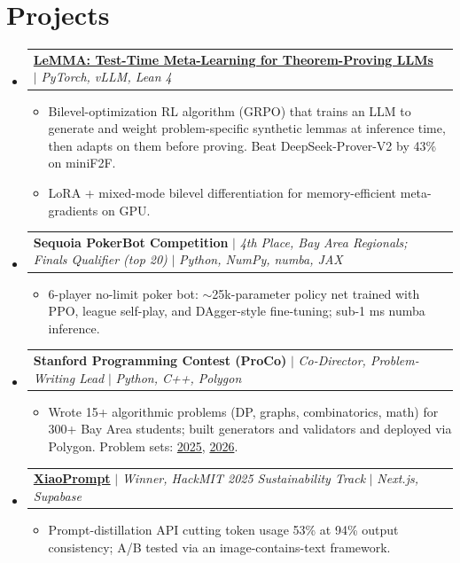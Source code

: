 \documentclass[letterpaper,10.5pt]{article}
\makeatletter
\newcommand{\resumeItem}[1]{\item\small{{#1 \vspace{-1pt}}}}
\newcommand{\resumeProjectHeading}[2]{
    \item
    \begin{tabular*}{0.97\textwidth}{l@{\extracolsep{\fill}}r}
      \small#1 & #2 \\
    \end{tabular*}\vspace{-7pt}
}
\newcommand{\resumeSubHeadingListStart}{\begin{itemize}[leftmargin=0.15in, label={}]}
\newcommand{\resumeSubHeadingListEnd}{\end{itemize}}
\newcommand{\resumeItemListStart}{\begin{itemize}}
\newcommand{\resumeItemListEnd}{\end{itemize}\vspace{-4pt}}
\makeatother
\begin{document}
\section{Projects}
    \resumeSubHeadingListStart
      \resumeProjectHeading
          {\textbf{\href{https://sandrayang.com/lemma.pdf}{LeMMA: Test-Time Meta-Learning for Theorem-Proving LLMs}} $|$ \emph{PyTorch, vLLM, Lean 4}}{}
          \resumeItemListStart
            \resumeItem{Bilevel-optimization RL algorithm (GRPO) that trains an LLM to generate and weight problem-specific synthetic lemmas at inference time, then adapts on them before proving. Beat DeepSeek-Prover-V2 by 43\% on miniF2F.}
            \resumeItem{LoRA + mixed-mode bilevel differentiation for memory-efficient meta-gradients on GPU.}
          \resumeItemListEnd
      \resumeProjectHeading
          {\textbf{Sequoia PokerBot Competition} $|$ \emph{4th Place, Bay Area Regionals; Finals Qualifier (top 20)} $|$ \emph{Python, NumPy, numba, JAX}}{}
          \resumeItemListStart
            \resumeItem{6-player no-limit poker bot: $\sim$25k-parameter policy net trained with PPO, league self-play, and DAgger-style fine-tuning; sub-1 ms numba inference.}
          \resumeItemListEnd
      \resumeProjectHeading
          {\textbf{Stanford Programming Contest (ProCo)} $|$ \emph{Co-Director, Problem-Writing Lead} $|$ \emph{Python, C++, Polygon}}{}
          \resumeItemListStart
            \resumeItem{Wrote 15+ algorithmic problems (DP, graphs, combinatorics, math) for 300+ Bay Area students; built generators and validators and deployed via Polygon. Problem sets: \href{https://codeforces.com/gym/592245}{2025}, \href{https://codeforces.com/gym/676302}{2026}.}
          \resumeItemListEnd
      \resumeProjectHeading
          {\textbf{\href{https://github.com/birdhumming/xiao-prompt}{XiaoPrompt}} $|$ \emph{Winner, HackMIT 2025 Sustainability Track} $|$ \emph{Next.js, Supabase}}{}
          \resumeItemListStart
            \resumeItem{Prompt-distillation API cutting token usage 53\% at 94\% output consistency; A/B tested via an image-contains-text framework.}
          \resumeItemListEnd
    \resumeSubHeadingListEnd
\end{document}
